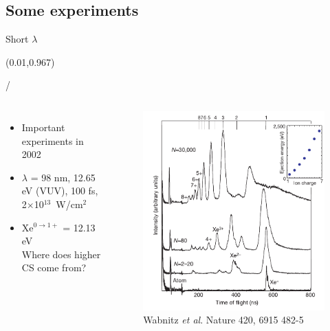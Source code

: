 \documentclass{beamer}
\makeatletter
\newcommand{\framenumber}{
\begin{textblock}{0}(0.01,0.967)
\begin{scriptsize}
{\color{gray}\insertframenumber/\inserttotalframenumber}
\end{scriptsize}
\end{textblock}
}
\makeatother
\begin{document}
\subsection{Some experiments}
\begin{frame}{Short $\lambda$}\framenumber
	\begin{columns}
			\begin{itemize}
			\item Important experiments in 2002
			\item $\lambda$ = 98 nm, 12.65 eV (VUV), 100 fs, 2$\times$10$^{13}$~W/cm$^2$
			\item Xe$^{0\rightarrow1+}$ = 12.13 eV\\Where does higher CS come from?
			\end{itemize}
			\begin{figure}
			\includegraphics[width=\textwidth]{figures/Wabnitz2002_fig1}
			\caption{{\tiny Wabnitz \textit{et al}. Nature 420, 6915 482-5}}
			\end{figure}
	\end{columns}
\end{frame}
\end{document}
